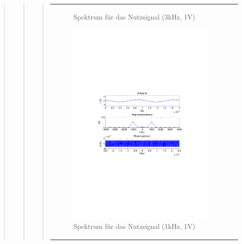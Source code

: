 \begin{quote}
\begin{quote}
\begin{quote}
\begin{center}
\begin{tabular}{ll}
\begin{minipage}{0.6\textwidth}
\begin{figure}[H]
                        \caption{Spektrum für das Nutzsignal (3kHz, 1V)}
                    \end{figure}

                \end{minipage}
                \begin{minipage}{0.6\textwidth}

                     \begin{figure}[H]
                        \includegraphics[scale=0.5, trim = 4cm 9.5cm 3.5cm
                        9.5cm, clip]{./Bilder/spektrum_sin1kHz}
                        \caption{Spektrum für das Nutzsignal (1kHz, 1V)}
                    \end{figure}
               \vspace{-1.5em}


\end{minipage}
\end{tabular}
\end{center}
\end{quote}
\end{quote}
\end{quote}
